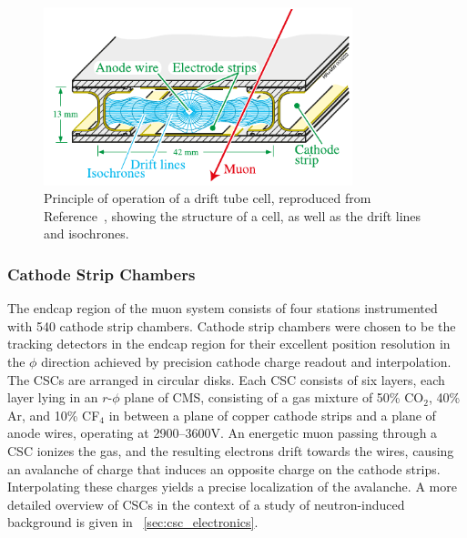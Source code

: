 \begin{figure}[tpb]
  \centering
  \includegraphics[width=0.8\textwidth]{figures/cms/DT.pdf}
  \caption[Principle of operation of a drift tube cell.]{Principle of operation of a drift tube cell, reproduced from Reference~\cite{Chatrchyan:2013sba}, showing the structure of a cell, as well as the drift lines and isochrones.}
  \label{cms:dt}
\end{figure}

\subsubsection{Cathode Strip Chambers}
The endcap region of the muon system consists of four stations instrumented with 540 cathode strip chambers.
Cathode strip chambers were chosen to be the tracking detectors in the endcap region for their excellent position resolution in the $\phi$ direction achieved by precision cathode charge readout and interpolation.
The CSCs are arranged in circular disks.
Each CSC consists of six layers, each layer lying in an $r$-$\phi$ plane of CMS, consisting of a gas mixture of 50\% CO$_2$, 40\% Ar, and 10\% CF$_4$ in between a plane of copper cathode strips and a plane of anode wires, operating at 2900--3600\unit{V}.
An energetic muon passing through a CSC ionizes the gas, and the resulting electrons drift towards the wires, causing an avalanche of charge that induces an opposite charge on the cathode strips.
Interpolating these charges yields a precise localization of the avalanche.
A more detailed overview of CSCs in the context of a study of neutron-induced background is given in \Sec~\ref{sec:csc_electronics}.

